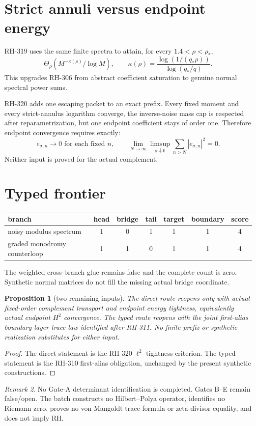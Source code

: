 \documentclass[11pt]{article}
\newtheorem{proposition}{Proposition}[section]
\theoremstyle{remark}\newtheorem{remark}[proposition]{Remark}
\begin{document}
\section{Strict annuli versus endpoint energy}
RH-319 uses the same finite spectra to attain, for every
$1.4<\rho<\rho_*$,
\[
 \Theta_\rho\left(M^{-\kappa(\rho)}/\log M\right),
 \qquad
 \kappa(\rho)=
 \frac{\log(1/(q_*\rho))}{\log(q_*/q)}.
\]
This upgrades RH-306 from abstract coefficient saturation to genuine normal
spectral power sums.

RH-320 adds one escaping packet to an exact prefix.  Every fixed moment and
every strict-annulus logarithm converge, the inverse-noise mass cap is
respected after reparametrization, but one endpoint coefficient stays of
order one.  Therefore endpoint convergence requires exactly:
\[
 e_{\sigma,n}\to0\text{ for each fixed }n,
 \qquad
 \lim_{N\to\infty}\limsup_{\sigma\downarrow0}
 \sum_{n>N}|e_{\sigma,n}|^2=0.
\]
Neither input is proved for the actual complement.

\section{Typed frontier}
\begin{center}\small
\begin{tabular}{lccccc|c}\toprule
branch & head & bridge & tail & target & boundary & score\\\midrule
noisy modulus spectrum &1&0&1&1&1&4\\
graded monodromy counterloop &1&1&0&1&1&4\\\bottomrule
\end{tabular}
\end{center}
The weighted cross-branch glue remains false and the complete count is zero.
Synthetic normal matrices do not fill the missing actual bridge coordinate.

\begin{proposition}[two remaining inputs]
The direct route reopens only with actual fixed-order complement transport
and endpoint energy tightness, equivalently actual endpoint $H^2$
convergence.  The typed route reopens with the joint first-alias
boundary-layer trace law identified after RH-311.  No finite-prefix or
synthetic realization substitutes for either input.
\end{proposition}
\begin{proof}
The direct statement is the RH-320 $\ell^2$ tightness criterion.  The typed
statement is the RH-310 first-alias obligation, unchanged by the present
synthetic constructions.
\end{proof}

\begin{remark}
No Gate-A determinant identification is completed.  Gates B--E remain
false/open.  The batch constructs no Hilbert--Polya operator, identifies no
Riemann zero, proves no von Mangoldt trace formula or zeta-divisor equality,
and does not imply RH.
\end{remark}
\end{document}
